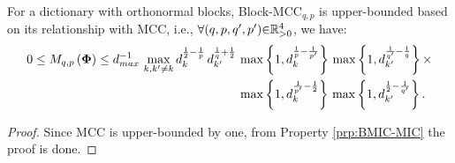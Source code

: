 \begin{property}
\label{prp:BMIC-orth-bound2} 
For a dictionary with orthonormal blocks, Block-MCC$_{q,p}$ is upper-bounded based on its relationship with MCC, i.e., $\forall (q , p , q' , p') {\in} \mathbb{R}^4_{{>} 0}$, we have: %
\begin{gather*}
\begin{aligned}
0 \leq M_{q,p}\left( \boldsymbol{\Phi} \right) \leq 
d_{max}^{-1} \, \max_{k,k' \neq k} d_{k}^{\frac12 - \frac1p} \, d_{k'}^{\frac1q + \frac12} \, &\max \left\lbrace 1 , d_k^{\frac1p - \frac{1}{p'}} \right\rbrace \, \max \left\lbrace 1 , d_{k'}^{\frac{1}{q'} - \frac1q} \right\rbrace \times \\
&\max \left\lbrace 1 , d_k^{\frac{1}{p'} -\frac12} \right\rbrace \, \max \left\lbrace 1 , d_{k'}^{\frac{1}{2} - \frac{1}{q'}} \right\rbrace.
\end{aligned}
\end{gather*}

\end{property}
\begin{proof}
Since MCC is upper-bounded by one, from Property \ref{prp:BMIC-MIC} the proof is done.
\end{proof}